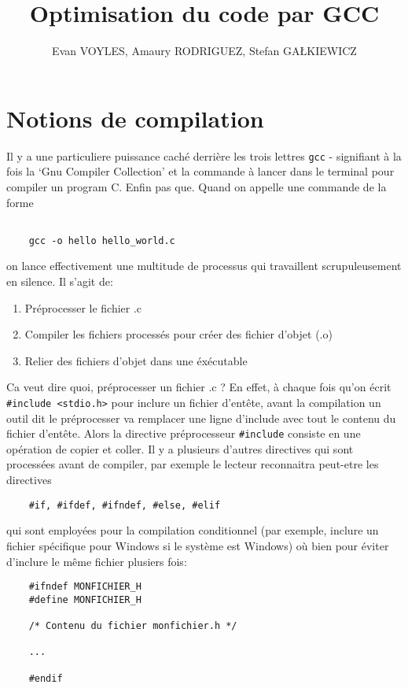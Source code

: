 \documentclass[11pt]{article} %
\title{Optimisation du code par GCC}
\author{Evan VOYLES, Amaury RODRIGUEZ, Stefan GA\L KIEWICZ}
\begin{document}
\maketitle

\section*{Notions de compilation}
Il y a une particuliere puissance caché derrière les trois lettres \verb|gcc| - signifiant à la fois
la `Gnu Compiler Collection' et la commande à lancer dans le terminal pour compiler un program C. Enfin pas que.
Quand on appelle une commande de la forme
\begin{verbatim}

    gcc -o hello hello_world.c
\end{verbatim}
on lance effectivement une multitude de processus qui travaillent scrupuleusement en silence.
Il s'agit de:
\begin{enumerate}
    \item Préprocesser le fichier .c
    \item Compiler les fichiers processés pour créer des fichier d'objet (.o)
    \item Relier des fichiers d'objet dans une éxécutable
\end{enumerate}

Ca veut dire quoi, préprocesser un fichier .c ? En effet, à chaque fois qu'on
écrit \verb|#include <stdio.h>| pour inclure un fichier d'entête, avant la compilation
un outil dit le préprocesser va remplacer une ligne d'include avec tout le contenu du fichier d'entête.
Alors la directive préprocesseur \verb|#include| consiste en une opération de copier et coller. Il y a plusieurs d'autres directives qui sont processées avant de compiler,
par exemple le lecteur reconnaitra peut-etre les directives
\begin{verbatim}
    #if, #ifdef, #ifndef, #else, #elif
\end{verbatim}
qui sont employées
pour la compilation conditionnel (par exemple, inclure un fichier spécifique pour Windows si le système est Windows)
où bien pour éviter d'inclure le même fichier plusiers fois:
\begin{verbatim}
    #ifndef MONFICHIER_H
    #define MONFICHIER_H

    /* Contenu du fichier monfichier.h */

    ...

    #endif
\end{verbatim}
\end{document}
